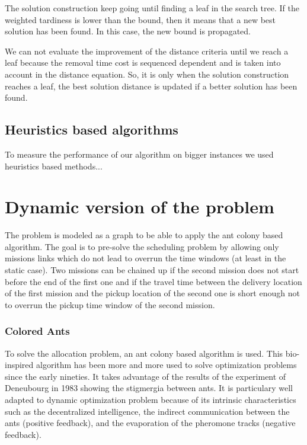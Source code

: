 \documentclass[a4paper,10pt]{article}
\begin{document}
  The solution construction keep going until finding a leaf in the search tree. If the weighted tardiness is lower than the bound, then it means that a new best solution has been found. In this case, the new bound is propagated.

  We can not evaluate the improvement of the distance criteria until we reach a leaf because the removal time cost is sequenced dependent and is taken into account in the distance equation. So, it is only when the solution construction reaches a leaf, the best solution distance is updated if a better solution has been found.


  
 \subsection{Heuristics based algorithms}
  To measure the performance of our algorithm on bigger instances we used heuristics based methods...



   \section{Dynamic version of the problem}

The problem is modeled as a graph to be able to apply the ant colony based algorithm. The goal is to pre-solve the scheduling problem by allowing only missions links which do not lead to overrun the time windows (at least in the static case). Two missions can be chained up if the second mission does not start before the end of the first one and if the travel time between the delivery location of the first mission and the pickup location of the second one is short enough not to overrun the pickup time window of the second mission.


\subsubsection{Colored Ants}
To solve the allocation problem, an ant colony based algorithm is used. This bio-inspired algorithm has been more and more used to solve optimization problems since the early nineties\cite{Dorigo2006}. It takes advantage of the results of the experiment of Deneubourg in 1983 \cite{Deneubourg1983} showing the stigmergia between ants. It is particulary well adapted to dynamic optimization problem because of its intrinsic characteristics such as the decentralized intelligence, the indirect communication between the ants (positive feedback), and the evaporation of the pheromone tracks (negative feedback).
\end{document}
